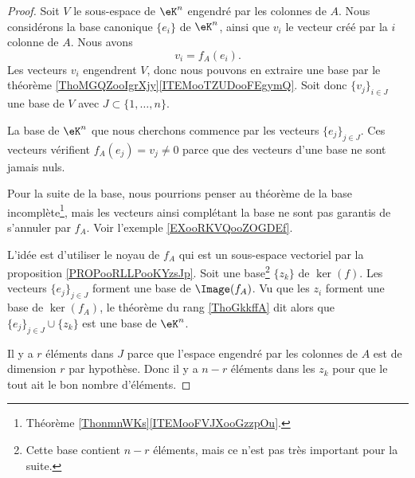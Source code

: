 \begin{proof}
    Soit \( V\) le sous-espace de \( \eK^n\) engendré par les colonnes de \( A\). Nous considérons la base canonique \( \{ e_i \}\) de \( \eK^n\), ainsi que \( v_i\) le vecteur créé par la \( i\)\ieme colonne de \( A\). Nous avons
    \begin{equation}
        v_i=f_A(e_i).
    \end{equation}
    Les vecteurs \( v_i\) engendrent \( V\), donc nous pouvons en extraire une base par le théorème \ref{ThoMGQZooIgrXjy}\ref{ITEMooTZUDooFEgymQ}. Soit donc \( \{ v_j \}_{i\in J}\) une base de \( V\) avec \( J\subset\{ 1,\ldots, n \}\).

    La base de \( \eK^n\) que nous cherchons commence par les vecteurs \( \{ e_j \}_{j\in J}\). Ces vecteurs vérifient \( f_A(e_j)=v_j\neq 0\) parce que des vecteurs d'une base ne sont jamais nuls.

    Pour la suite de la base, nous pourrions penser au théorème de la base incomplète\footnote{Théorème \ref{ThonmnWKs}\ref{ITEMooFVJXooGzzpOu}.}, mais les vecteurs ainsi complétant la base ne sont pas garantis de s'annuler par \( f_A\). Voir l'exemple \ref{EXooRKVQooZOGDEf}.

    L'idée est d'utiliser le noyau de \( f_A\) qui est un sous-espace vectoriel par la proposition \ref{PROPooRLLPooKYzsJp}. Soit une base\footnote{Cette base contient \( n-r\) éléments, mais ce n'est pas très important pour la suite.} \(  \{ z_k \}  \) de \( \ker(f)\). Les vecteurs \( \{ e_j \}_{j\in J}\) forment une base de \( \Image(f_A)\). Vu que les \( z_i\) forment une base de \( \ker(f_A)\), le théorème du rang \ref{ThoGkkffA} dit alors que \( \{ e_j \}_{j\in J}\cup \{ z_k \}\) est une base de \( \eK^n\).

    Il y a \( r\) éléments dans \( J\) parce que l'espace engendré par les colonnes de \( A\) est de dimension \( r\) par hypothèse. Donc il y a \( n-r\) éléments dans les \( z_k\) pour que le tout ait le bon nombre d'éléments.
\end{proof}

